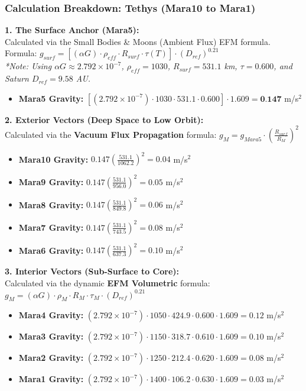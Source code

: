 \documentclass[11pt, a4paper]{article}
\begin{document}
\clearpage
\subsubsection{Calculation Breakdown: Tethys (Mara10 to Mara1)}

\noindent \textbf{1. The Surface Anchor (Mara5):} \\
Calculated via the Small Bodies \& Moons (Ambient Flux) EFM formula. \\
Formula: $g_{surf} = \left[ (\alpha G) \cdot \rho_{eff} \cdot R_{surf} \cdot \tau(T) \right] \cdot (D_{ref})^{0.21}$ \\
\textit{*Note: Using $\alpha G \approx 2.792 \times 10^{-7}$, $\rho_{eff} = 1030$, $R_{surf} = 531.1$ km, $\tau = 0.600$, and Saturn $D_{ref} = 9.58$ AU.}
\begin{itemize}
  \item \textbf{Mara5 Gravity:} $\left[ (2.792 \times 10^{-7}) \cdot 1030 \cdot 531.1 \cdot 0.600 \right] \cdot 1.609 = \textbf{0.147}$ m/s$^2$
\end{itemize}

\vspace{0.5em}
\noindent \textbf{2. Exterior Vectors (Deep Space to Low Orbit):} \\
Calculated via the \textbf{Vacuum Flux Propagation} formula: $g_M = g_{Mara5} \cdot \left( \frac{R_{surf}}{R_M} \right)^2$
\begin{itemize}
  \item \textbf{Mara10 Gravity:} $0.147 \left( \frac{531.1}{1062.2} \right)^2 = 0.04$ m/s$^2$
  \item \textbf{Mara9 Gravity:} $0.147 \left( \frac{531.1}{956.0} \right)^2 = 0.05$ m/s$^2$
  \item \textbf{Mara8 Gravity:} $0.147 \left( \frac{531.1}{849.8} \right)^2 = 0.06$ m/s$^2$
  \item \textbf{Mara7 Gravity:} $0.147 \left( \frac{531.1}{743.5} \right)^2 = 0.08$ m/s$^2$
  \item \textbf{Mara6 Gravity:} $0.147 \left( \frac{531.1}{637.3} \right)^2 = 0.10$ m/s$^2$
\end{itemize}

\vspace{0.5em}
\noindent \textbf{3. Interior Vectors (Sub-Surface to Core):} \\
Calculated via the dynamic \textbf{EFM Volumetric} formula: $g_M = (\alpha G) \cdot \rho_{M} \cdot R_M \cdot \tau_M \cdot (D_{ref})^{0.21}$
\begin{itemize}
  \item \textbf{Mara4 Gravity:} $(2.792 \times 10^{-7}) \cdot 1050 \cdot 424.9 \cdot 0.600 \cdot 1.609 = 0.12$ m/s$^2$
  \item \textbf{Mara3 Gravity:} $(2.792 \times 10^{-7}) \cdot 1150 \cdot 318.7 \cdot 0.610 \cdot 1.609 = 0.10$ m/s$^2$
  \item \textbf{Mara2 Gravity:} $(2.792 \times 10^{-7}) \cdot 1250 \cdot 212.4 \cdot 0.620 \cdot 1.609 = 0.08$ m/s$^2$
  \item \textbf{Mara1 Gravity:} $(2.792 \times 10^{-7}) \cdot 1400 \cdot 106.2 \cdot 0.630 \cdot 1.609 = 0.03$ m/s$^2$
\end{itemize}
\end{document}
